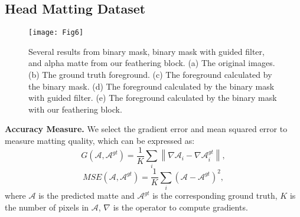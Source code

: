 \documentclass[sigconf]{acmart}
\begin{document}
\subsection{Head Matting Dataset}\begin{figure*}
\texttt{[image: Fig6]}
\caption{Several results from binary mask, binary mask with guided filter, and alpha matte from our feathering block. (a) The original images. (b) The ground truth foreground. (c) The foreground calculated by the binary mask. (d) The foreground calculated by the binary mask with guided filter. (e) The foreground calculated by the binary mask with our feathering block.}
\label{tag:comparemethods}
\end{figure*}\textbf{Accuracy Measure.} We select the gradient error and mean squared error to measure matting quality, which can be expressed as:
\begin{equation}
 G\left( {\mathscr{A},{\mathscr{A}^{gt}}} \right) = \frac{1}{K}\sum\limits_i {\left\| {\nabla {\mathscr{A}_i} - \nabla \mathscr{A}_i^{gt}} \right\|},
\end{equation}\begin{equation}
 MSE\left( \mathscr{A},\mathscr{A}^{gt} \right) =\frac{1}{K}\sum_i{\left( \mathscr{A}-\mathscr{A}^{gt} \right) ^2},
\end{equation}
where $\mathscr{A}$ is the predicted matte and $\mathscr{A}^{gt}$ is the corresponding ground truth, $K$ is the number of pixels in $\mathscr{A}$, $\nabla $ is the operator to compute gradients.
\end{document}
